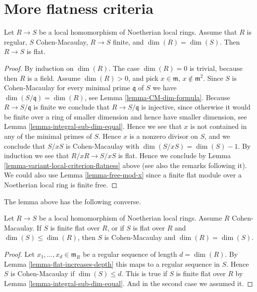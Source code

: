 \section{More flatness criteria}
\label{section-more-flatness-criteria}

\begin{lemma}
\label{lemma-CM-over-regular-flat}
Let $R \to S$ be a local homomorphism of Noetherian local
rings. Assume that $R$ is regular, $S$ Cohen-Macaulay,
$R \to S$ finite, and $\dim(R) = \dim(S)$. Then $R \to S$ is
flat.
\end{lemma}

\begin{proof}
By induction on $\dim(R)$. The case $\dim(R) = 0$ is trivial, because
then $R$ is a field. Assume $\dim(R) > 0$, and pick
$x \in \mathfrak m$, $x \not \in \mathfrak m^2$. Since $S$ is Cohen-Macaulay
for every minimal prime $\mathfrak q$ of $S$ we have
$\dim(S/\mathfrak q) = \dim(R)$, see Lemma \ref{lemma-CM-dim-formula}.
Because $R \to S/\mathfrak q$ is
finite we conclude that $R \to S/\mathfrak q$ is injective,
since otherwise it would be finite over a ring of smaller dimension
and hence have smaller dimension, see Lemma \ref{lemma-integral-sub-dim-equal}.
Hence we see that $x$ is not contained in any of the minimal
primes of $S$. Hence $x$ is a nonzero divisor on $S$, and we conclude
that $S/xS$ is Cohen-Macaulay with $\dim(S/xS) = \dim(S) - 1$.
By induction we see that $R/xR \to S/xS$ is flat. Hence we
conclude by Lemma \ref{lemma-variant-local-criterion-flatness} above
(see also the remarks following it). We could also use
Lemma \ref{lemma-free-mod-x} since a finite flat module over a
Noetherian local ring is finite free.
\end{proof}

\noindent
The lemma above has the following converse.

\begin{lemma}
\label{lemma-finite-flat-over-regular-CM}
Let $R \to S$ be a local homomorphism of Noetherian local rings.
Assume $R$ Cohen-Macaulay.
If $S$ is finite flat over $R$, or if $S$ is flat over $R$ and
$\dim(S) \leq \dim(R)$, then $S$ is Cohen-Macaulay and $\dim(R) = \dim(S)$.
\end{lemma}

\begin{proof}
Let $x_1, \ldots, x_d \in \mathfrak m_R$ be a regular sequence
of length $d = \dim(R)$. By Lemma \ref{lemma-flat-increases-depth}
this maps to a regular sequence in $S$.
Hence $S$ is Cohen-Macaulay if $\dim(S) \leq d$. This is true
if $S$ is finite flat over $R$ by Lemma \ref{lemma-integral-sub-dim-equal}.
And in the second case we assumed it.
\end{proof}


